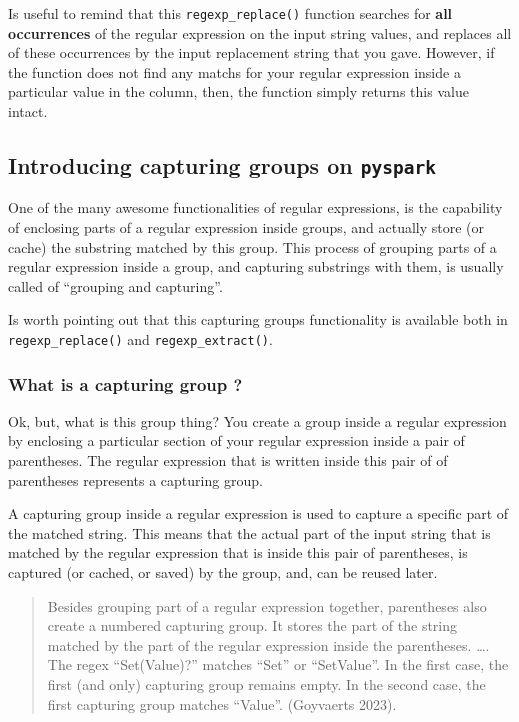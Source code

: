 \documentclass[
  11pt,
  letterpaper,
  DIV=11,
  numbers=noendperiod]{scrreprt}
\begin{document}
Is useful to remind that this \texttt{regexp\_replace()} function
searches for \textbf{all occurrences} of the regular expression on the
input string values, and replaces all of these occurrences by the input
replacement string that you gave. However, if the function does not find
any matchs for your regular expression inside a particular value in the
column, then, the function simply returns this value intact.

\subsection{\texorpdfstring{Introducing capturing groups on
\texttt{pyspark}}{Introducing capturing groups on pyspark}}\label{introducing-capturing-groups-on-pyspark}

One of the many awesome functionalities of regular expressions, is the
capability of enclosing parts of a regular expression inside groups, and
actually store (or cache) the substring matched by this group. This
process of grouping parts of a regular expression inside a group, and
capturing substrings with them, is usually called of ``grouping and
capturing''.

Is worth pointing out that this capturing groups functionality is
available both in \texttt{regexp\_replace()} and
\texttt{regexp\_extract()}.

\subsubsection{What is a capturing group
?}\label{what-is-a-capturing-group}

Ok, but, what is this group thing? You create a group inside a regular
expression by enclosing a particular section of your regular expression
inside a pair of parentheses. The regular expression that is written
inside this pair of of parentheses represents a capturing group.

A capturing group inside a regular expression is used to capture a
specific part of the matched string. This means that the actual part of
the input string that is matched by the regular expression that is
inside this pair of parentheses, is captured (or cached, or saved) by
the group, and, can be reused later.

\begin{quote}
Besides grouping part of a regular expression together, parentheses also
create a numbered capturing group. It stores the part of the string
matched by the part of the regular expression inside the parentheses.
\ldots. The regex ``Set(Value)?'' matches ``Set'' or ``SetValue''. In
the first case, the first (and only) capturing group remains empty. In
the second case, the first capturing group matches ``Value''. (Goyvaerts
2023).
\end{quote}
\end{document}
